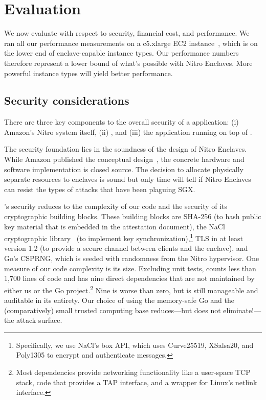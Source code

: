 \section{Evaluation}%
\label{sec:evaluation}

We now evaluate \tool{} with respect to security, financial cost, and
performance.  We ran all our performance measurements on a c5.xlarge EC2
instance~\cite{c5-instance}, which is on the lower end of enclave-capable
instance types.  Our performance numbers therefore represent a lower bound of
what's possible with Nitro Enclaves.  More powerful instance types will yield
better performance.

\subsection{Security considerations}%
\label{sec:security}

There are three key components to the overall security of a \tool{} application:
(i) Amazon's Nitro system itself,
(ii) \tool{}, and
(iii) the application running on top of \tool{}.

The security foundation lies in the soundness of the design of Nitro Enclaves.
While Amazon published the conceptual design~\cite{Bean2022a}, the concrete
hardware and software implementation is closed source.  The decision to
allocate physically separate resources to enclaves is sound but only time will
tell if Nitro Enclaves can resist the types of attacks that have been plaguing
SGX.

\Tool{}'s security reduces to the complexity of our code and the security of its
cryptographic building blocks.  These building blocks are SHA-256 (to hash
public key material that is embedded in the attestation document), the NaCl
cryptographic library~\cite{nacl} (to implement key
synchronization),\footnote{Specifically, we use NaCl's box API, which uses
Curve25519, XSalsa20, and Poly1305 to encrypt and authenticate messages.} TLS in
at least version 1.2 (to provide a secure channel between clients and the
enclave), and Go's CSPRNG, which is seeded with randomness from the Nitro
hypervisor.
One measure of our code complexity is its size.  Excluding unit tests, \tool{}
counts less than 1,700 lines of code and has nine direct dependencies
that are not maintained by either us or the Go project.\footnote{Most
dependencies provide networking functionality like a user-space TCP stack, code
that provides a TAP interface, and a wrapper for Linux's netlink interface.}
%
Nine is worse than zero, but is still manageable and auditable in its entirety.
Our choice of using the memory-safe Go and the (comparatively) small trusted
computing base reduces---but does not eliminate!---the attack surface.


